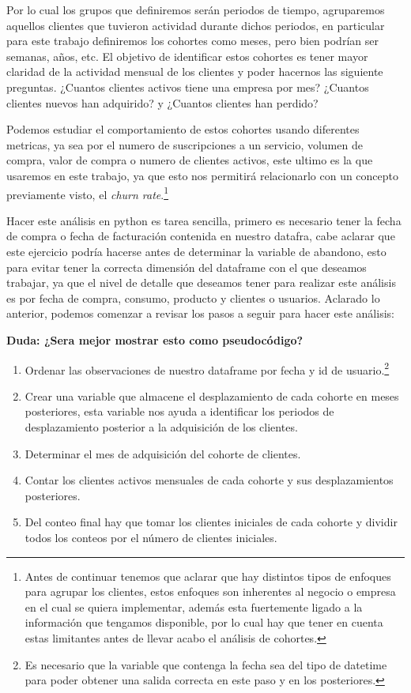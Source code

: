 Por lo cual los grupos que definiremos serán periodos de tiempo, agruparemos aquellos clientes que tuvieron actividad durante dichos periodos, en particular para este trabajo definiremos los cohortes como meses, pero bien podrían ser semanas, años, etc. El objetivo de identificar estos cohortes es tener mayor claridad de la actividad mensual de los clientes y poder hacernos las siguiente preguntas. ¿Cuantos clientes activos tiene una empresa por mes? ¿Cuantos clientes nuevos han adquirido? y ¿Cuantos clientes han perdido?

Podemos estudiar el comportamiento de estos cohortes usando diferentes metricas, ya sea por el numero de suscripciones a un servicio, volumen de compra, valor de compra o numero de clientes activos, este ultimo es la que usaremos en este trabajo, ya que esto nos permitirá relacionarlo con un concepto previamente visto, el \textit{churn rate}.\footnote{Antes de continuar tenemos que aclarar que hay distintos tipos de enfoques para agrupar los clientes, estos enfoques son inherentes al negocio o empresa en el cual se quiera implementar, además esta fuertemente ligado a la información que tengamos disponible, por lo cual hay que tener en cuenta estas limitantes antes de llevar acabo el análisis de cohortes.} 

Hacer este análisis en python es tarea sencilla, primero es necesario tener la fecha de compra o fecha de facturación contenida en nuestro datafra, cabe aclarar que este ejercicio podría hacerse antes de determinar la variable de abandono, esto para evitar tener la correcta dimensión del dataframe con el que deseamos trabajar, ya que el nivel de detalle que deseamos tener para realizar este análisis es por fecha de compra, consumo, producto y clientes o usuarios. Aclarado lo anterior, podemos comenzar a revisar los pasos a seguir para hacer este análisis:


\textbf{Duda: ¿Sera mejor mostrar esto como pseudocódigo?}
\begin{enumerate}
	\item Ordenar las observaciones de nuestro dataframe por fecha y id de usuario.\footnote{Es necesario que la variable que contenga la fecha sea del tipo de datetime para poder obtener una salida correcta en este paso y en los posteriores.}
	\item Crear una variable que almacene el desplazamiento de cada cohorte en meses posteriores, esta variable nos ayuda a identificar los periodos de desplazamiento posterior a la adquisición de los clientes.
	\item Determinar el mes de adquisición del cohorte de clientes.
	\item Contar los clientes activos mensuales de cada cohorte y sus desplazamientos posteriores.
	\item Del conteo final hay que tomar los clientes iniciales de cada cohorte y dividir todos los conteos por el número de clientes iniciales.
\end{enumerate}

